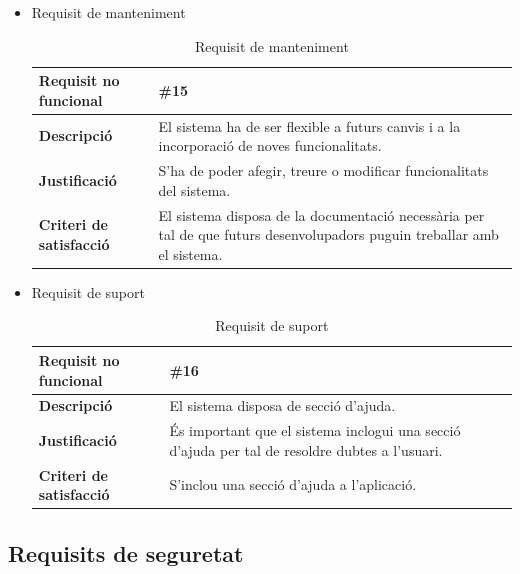 \begin{itemize}
\item{Requisit de manteniment}

\begin{table}[!h]
\centering
\begin{tabular}{|l|M|}
\hline
\textbf{Requisit no funcional }& \#15  \\ \hline
\textbf{Descripció} & El sistema ha de ser flexible a futurs canvis i a la incorporació de noves funcionalitats.\\ \hline
\textbf{Justificació} & S’ha de poder afegir, treure o modificar funcionalitats
del sistema. \\ \hline
\textbf{Criteri de satisfacció} & El sistema disposa de la documentació necessària per tal de que futurs desenvolupadors puguin treballar amb el sistema.\\ \hline
\end{tabular}
\label{}
\caption{Requisit de manteniment}
\end{table}

\item{Requisit de suport}

\begin{table}[!h]
\centering
\begin{tabular}{|l|M|}
\hline
\textbf{Requisit no funcional }& \#16  \\ \hline
\textbf{Descripció} & El sistema disposa de secció d’ajuda.\\ \hline
\textbf{Justificació} & És important que el sistema inclogui una secció d’ajuda per tal de resoldre dubtes a l’usuari. \\ \hline
\textbf{Criteri de satisfacció} & S’inclou una secció d’ajuda a l’aplicació.\\ \hline
\end{tabular}
\label{}
\caption{Requisit de suport}
\end{table}

\end{itemize}

\subsection{Requisits de seguretat}

